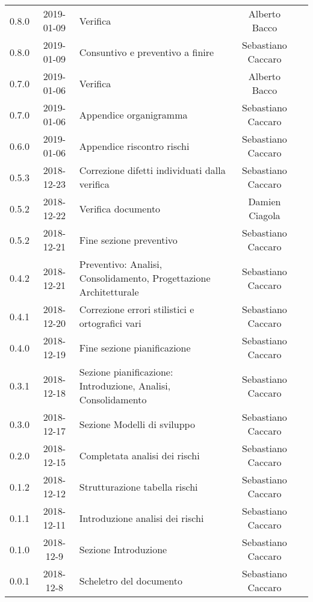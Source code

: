 {\begin{longtable}{ c c  C{4cm}  c  c }
		0.8.0 & 2019-01-09 & Verifica & Alberto Bacco & \ver{}\\
		
		0.8.0 & 2019-01-09 & Consuntivo e preventivo a finire & Sebastiano Caccaro & \reda{}\\			
		
		0.7.0 & 2019-01-06 & Verifica & Alberto Bacco & \ver{}\\		
		
		0.7.0 & 2019-01-06 & Appendice organigramma & Sebastiano Caccaro & \reda{}\\		
		
		0.6.0 & 2019-01-06 & Appendice riscontro rischi & Sebastiano Caccaro & \reda{}\\
					
		0.5.3 & 2018-12-23 & Correzione difetti individuati dalla verifica & Sebastiano Caccaro & \reda{}\\		
		
		0.5.2 & 2018-12-22 & Verifica documento & Damien Ciagola & \ver{}\\
		
		0.5.2 & 2018-12-21 & Fine sezione preventivo & Sebastiano Caccaro & \reda{}\\
		
		0.4.2 & 2018-12-21 & Preventivo: Analisi, Consolidamento, Progettazione Architetturale & Sebastiano Caccaro & \reda{}\\
		
		0.4.1 & 2018-12-20 & Correzione errori stilistici e ortografici vari & Sebastiano Caccaro & \reda{}\\
		
		0.4.0 & 2018-12-19 & Fine sezione pianificazione & Sebastiano Caccaro & \reda{}\\
		
		0.3.1 & 2018-12-18 & Sezione pianificazione: Introduzione, Analisi, Consolidamento & Sebastiano Caccaro & \reda{}\\
		
		0.3.0 & 2018-12-17 & Sezione Modelli di sviluppo & Sebastiano Caccaro & \reda{}\\
				
		0.2.0 & 2018-12-15 & Completata analisi dei rischi & Sebastiano Caccaro & \reda{}\\
				
		0.1.2 & 2018-12-12 & Strutturazione tabella rischi & Sebastiano Caccaro & \reda{}\\
				
		0.1.1 & 2018-12-11 & Introduzione analisi dei rischi & Sebastiano Caccaro & \reda{}\\
				
		0.1.0 & 2018-12-9 & Sezione Introduzione & Sebastiano Caccaro & \reda{}\\
		
		0.0.1 & 2018-12-8 & Scheletro del documento & Sebastiano Caccaro & \reda{}\\
		
	\end{longtable}

}